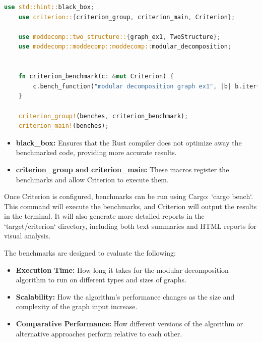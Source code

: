 \begin{myex}

\end{myex}

\begin{lstlisting}[language=Rust, style=rust, caption={Example of benchmark code for modular decomposition}, label={lst:rust-example-of-benchmark-code}, firstnumber=1]
    use std::hint::black_box;
    use criterion::{criterion_group, criterion_main, Criterion};

    use moddecomp::two_structure::{graph_ex1, TwoStructure};
    use moddecomp::moddecomp::moddecomp::modular_decomposition;


    fn criterion_benchmark(c: &mut Criterion) {
        c.bench_function("modular decomposition graph ex1", |b| b.iter(|| modular_decomposition(black_box(&mut graph_ex1()), black_box(None))));
    }

    criterion_group!(benches, criterion_benchmark);
    criterion_main!(benches);
\end{lstlisting}

\begin{itemize}
    \item \textbf{black\_box:} Ensures that the Rust compiler does not optimize away the benchmarked code, providing more accurate results.
    \item \textbf{criterion\_group and criterion\_main:} These macros register the benchmarks and allow Criterion to execute them.
\end{itemize}

Once Criterion is configured, benchmarks can be run using Cargo: `cargo bench`.
This command will execute the benchmarks, and Criterion will output the results in the terminal.
It will also generate more detailed reports in the `target/criterion` directory, including both text summaries and HTML reports for visual analysis.

The benchmarks are designed to evaluate the following:
\begin{itemize}
    \item \textbf{Execution Time:} How long it takes for the modular decomposition algorithm to run on different types and sizes of graphs.
    \item \textbf{Scalability:} How the algorithm’s performance changes as the size and complexity of the graph input increase.
    \item \textbf{Comparative Performance:} How different versions of the algorithm or alternative approaches perform relative to each other.
\end{itemize}

